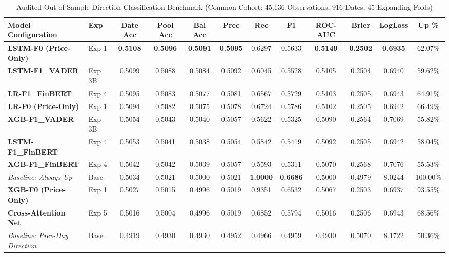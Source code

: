 \documentclass[10pt,journal,compsoc,twocolumn]{IEEEtran}
\begin{document}
\begin{table}[t]
\caption{Audited Out-of-Sample Direction Classification Benchmark (Common Cohort: 45,136 Observations, 916 Dates, 45 Expanding Folds)}
\label{tab:classification}
\centering
\small
\begin{tabular}{llcccccccccc}
\toprule
\textbf{Model Configuration} & \textbf{Exp} & \textbf{Date Acc} & \textbf{Pool Acc} & \textbf{Bal Acc} & \textbf{Prec} & \textbf{Rec} & \textbf{F1} & \textbf{ROC-AUC} & \textbf{Brier} & \textbf{LogLoss} & \textbf{Up \%} \\
\midrule
\textbf{LSTM-F0 (Price-Only)} & Exp 1 & \textbf{0.5108} & \textbf{0.5096} & \textbf{0.5091} & \textbf{0.5095} & 0.6297 & 0.5633 & \textbf{0.5149} & \textbf{0.2502} & \textbf{0.6935} & 62.07\% \\
\textbf{LSTM-F1\_VADER} & Exp 3B & 0.5099 & 0.5088 & 0.5084 & 0.5092 & 0.6045 & 0.5528 & 0.5105 & 0.2504 & 0.6940 & 59.62\% \\
\textbf{LR-F1\_FinBERT} & Exp 4 & 0.5095 & 0.5083 & 0.5077 & 0.5081 & 0.6567 & 0.5729 & 0.5103 & 0.2505 & 0.6943 & 64.91\% \\
\textbf{LR-F0 (Price-Only)} & Exp 1 & 0.5094 & 0.5082 & 0.5075 & 0.5078 & 0.6724 & 0.5786 & 0.5102 & 0.2505 & 0.6942 & 66.49\% \\
\textbf{XGB-F1\_VADER} & Exp 3B & 0.5054 & 0.5043 & 0.5040 & 0.5057 & 0.5622 & 0.5325 & 0.5090 & 0.2564 & 0.7069 & 55.82\% \\
\textbf{LSTM-F1\_FinBERT} & Exp 4 & 0.5053 & 0.5041 & 0.5038 & 0.5054 & 0.5842 & 0.5419 & 0.5092 & 0.2505 & 0.6942 & 58.04\% \\
\textbf{XGB-F1\_FinBERT} & Exp 4 & 0.5042 & 0.5042 & 0.5039 & 0.5057 & 0.5593 & 0.5311 & 0.5070 & 0.2568 & 0.7076 & 55.53\% \\
\textit{Baseline: Always-Up} & Base & 0.5034 & 0.5021 & 0.5000 & 0.5021 & \textbf{1.0000} & \textbf{0.6686} & 0.5000 & 0.4979 & 8.0244 & 100.00\% \\
\textbf{XGB-F0 (Price-Only)} & Exp 1 & 0.5027 & 0.5015 & 0.4996 & 0.5019 & 0.9351 & 0.6532 & 0.5067 & 0.2503 & 0.6937 & 93.55\% \\
\textbf{Cross-Attention Net} & Exp 5 & 0.5016 & 0.5004 & 0.4996 & 0.5019 & 0.6852 & 0.5794 & 0.5016 & 0.2506 & 0.6943 & 68.56\% \\
\textit{Baseline: Prev-Day Direction} & Base & 0.4919 & 0.4930 & 0.4930 & 0.4952 & 0.4966 & 0.4959 & 0.4930 & 0.5070 & 8.1722 & 50.36\% \\
\bottomrule
\end{tabular}
\end{table}
\end{document}
